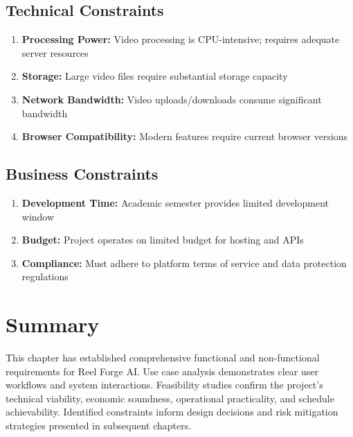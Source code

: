 \subsection{Technical Constraints}

\begin{enumerate}
    \item \textbf{Processing Power:} Video processing is CPU-intensive; requires adequate server resources
    \item \textbf{Storage:} Large video files require substantial storage capacity
    \item \textbf{Network Bandwidth:} Video uploads/downloads consume significant bandwidth
    \item \textbf{Browser Compatibility:} Modern features require current browser versions
\end{enumerate}

\subsection{Business Constraints}

\begin{enumerate}
    \item \textbf{Development Time:} Academic semester provides limited development window
    \item \textbf{Budget:} Project operates on limited budget for hosting and APIs
    \item \textbf{Compliance:} Must adhere to platform terms of service and data protection regulations
\end{enumerate}

\section{Summary}

This chapter has established comprehensive functional and non-functional requirements for Reel Forge AI. Use case analysis demonstrates clear user workflows and system interactions. Feasibility studies confirm the project's technical viability, economic soundness, operational practicality, and schedule achievability. Identified constraints inform design decisions and risk mitigation strategies presented in subsequent chapters.
